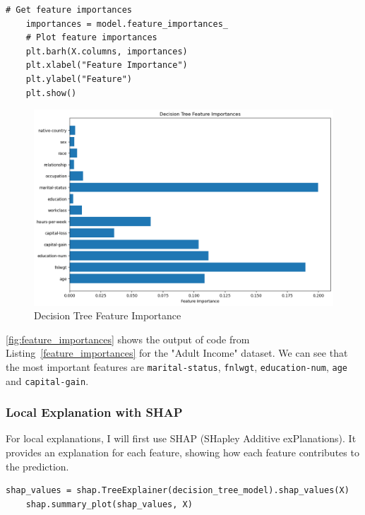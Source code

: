 \documentclass[10pt,journal,compsoc]{IEEEtran}
\begin{document}
\begin{lstlisting}[caption=Feature Importances, label=feature_importances]
    # Get feature importances
    importances = model.feature_importances_
    # Plot feature importances
    plt.barh(X.columns, importances)
    plt.xlabel("Feature Importance")
    plt.ylabel("Feature")
    plt.show()    
\end{lstlisting}

\begin{figure}[H]
    \centering
    \includegraphics[width=1\linewidth]{images/feature_importance_global.png}    
    \caption{Decision Tree Feature Importance}
    \label{fig:feature_importances}
\end{figure}

\autoref{fig:feature_importances} shows the output of code from Listing~\ref{feature_importances} for the "Adult Income" dataset. We can see that the most important features are \texttt{marital-status}, \texttt{fnlwgt}, \texttt{education-num}, \texttt{age} and \texttt{capital-gain}.


\subsubsection{Local Explanation with SHAP}
For local explanations, I will first use SHAP (SHapley Additive exPlanations). It provides an explanation for each feature, showing how each feature contributes to the prediction. 

\begin{lstlisting}[caption=SHAP Explainer , label=shap_explainer]
    shap_values = shap.TreeExplainer(decision_tree_model).shap_values(X)
    shap.summary_plot(shap_values, X)
\end{lstlisting}
\end{document}
